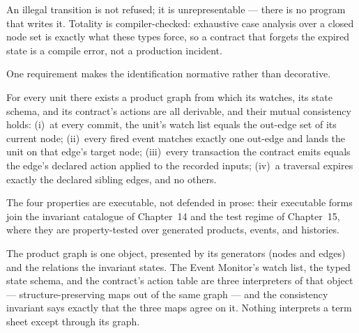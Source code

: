 An illegal transition is not refused; it is unrepresentable --- there is no program that
writes it. Totality is compiler-checked: exhaustive case analysis over a closed node set
is exactly what these types force, so a contract that forgets the expired state is a
compile error, not a production incident.

One requirement makes the identification normative rather than decorative.

\begin{invariant}\label{inv:graph-consistency}
For every unit there exists a product graph from which its watches, its state schema,
and its contract's actions are all derivable, and their mutual consistency holds:
(i)~at every commit, the unit's watch list equals the out-edge set of its current node;
(ii)~every fired event matches exactly one out-edge and lands the unit on that edge's
target node;
(iii)~every transaction the contract emits equals the edge's declared action applied to
the recorded inputs;
(iv)~a traversal expires exactly the declared sibling edges, and no others.
\end{invariant}

The four properties are executable, not defended in prose: their executable forms join
the invariant catalogue of Chapter~14 and the test regime of Chapter~15, where they are
property-tested over generated products, events, and histories.

\begin{secondtelling}
The product graph is one object, presented by its generators (nodes and edges) and the
relations the invariant states. The Event Monitor's watch list, the typed state schema,
and the contract's action table are three interpreters of that object ---
structure-preserving maps out of the same graph --- and the consistency invariant says
exactly that the three maps agree on it. Nothing interprets a term sheet except through
its graph.
\end{secondtelling}
